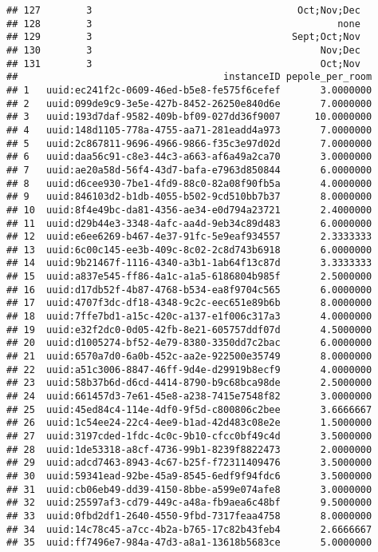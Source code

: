 \documentclass[
]{article}
\begin{document}
\begin{verbatim}
## 127        3                                    Oct;Nov;Dec
## 128        3                                           none
## 129        3                                   Sept;Oct;Nov
## 130        3                                        Nov;Dec
## 131        3                                        Oct;Nov
##                                    instanceID pepole_per_room
## 1   uuid:ec241f2c-0609-46ed-b5e8-fe575f6cefef       3.0000000
## 2   uuid:099de9c9-3e5e-427b-8452-26250e840d6e       7.0000000
## 3   uuid:193d7daf-9582-409b-bf09-027dd36f9007      10.0000000
## 4   uuid:148d1105-778a-4755-aa71-281eadd4a973       7.0000000
## 5   uuid:2c867811-9696-4966-9866-f35c3e97d02d       7.0000000
## 6   uuid:daa56c91-c8e3-44c3-a663-af6a49a2ca70       3.0000000
## 7   uuid:ae20a58d-56f4-43d7-bafa-e7963d850844       6.0000000
## 8   uuid:d6cee930-7be1-4fd9-88c0-82a08f90fb5a       4.0000000
## 9   uuid:846103d2-b1db-4055-b502-9cd510bb7b37       8.0000000
## 10  uuid:8f4e49bc-da81-4356-ae34-e0d794a23721       2.4000000
## 11  uuid:d29b44e3-3348-4afc-aa4d-9eb34c89d483       6.0000000
## 12  uuid:e6ee6269-b467-4e37-91fc-5e9eaf934557       2.3333333
## 13  uuid:6c00c145-ee3b-409c-8c02-2c8d743b6918       6.0000000
## 14  uuid:9b21467f-1116-4340-a3b1-1ab64f13c87d       3.3333333
## 15  uuid:a837e545-ff86-4a1c-a1a5-6186804b985f       2.5000000
## 16  uuid:d17db52f-4b87-4768-b534-ea8f9704c565       6.0000000
## 17  uuid:4707f3dc-df18-4348-9c2c-eec651e89b6b       8.0000000
## 18  uuid:7ffe7bd1-a15c-420c-a137-e1f006c317a3       4.0000000
## 19  uuid:e32f2dc0-0d05-42fb-8e21-605757ddf07d       4.5000000
## 20  uuid:d1005274-bf52-4e79-8380-3350dd7c2bac       6.0000000
## 21  uuid:6570a7d0-6a0b-452c-aa2e-922500e35749       8.0000000
## 22  uuid:a51c3006-8847-46ff-9d4e-d29919b8ecf9       4.0000000
## 23  uuid:58b37b6d-d6cd-4414-8790-b9c68bca98de       2.5000000
## 24  uuid:661457d3-7e61-45e8-a238-7415e7548f82       3.0000000
## 25  uuid:45ed84c4-114e-4df0-9f5d-c800806c2bee       3.6666667
## 26  uuid:1c54ee24-22c4-4ee9-b1ad-42d483c08e2e       1.5000000
## 27  uuid:3197cded-1fdc-4c0c-9b10-cfcc0bf49c4d       3.5000000
## 28  uuid:1de53318-a8cf-4736-99b1-8239f8822473       2.0000000
## 29  uuid:adcd7463-8943-4c67-b25f-f72311409476       3.5000000
## 30  uuid:59341ead-92be-45a9-8545-6edf9f94fdc6       3.5000000
## 31  uuid:cb06eb49-dd39-4150-8bbe-a599e074afe8       3.0000000
## 32  uuid:25597af3-cd79-449c-a48a-fb9aea6c48bf       9.5000000
## 33  uuid:0fbd2df1-2640-4550-9fbd-7317feaa4758       8.0000000
## 34  uuid:14c78c45-a7cc-4b2a-b765-17c82b43feb4       2.6666667
## 35  uuid:ff7496e7-984a-47d3-a8a1-13618b5683ce       5.0000000

\end{verbatim}
\end{document}
